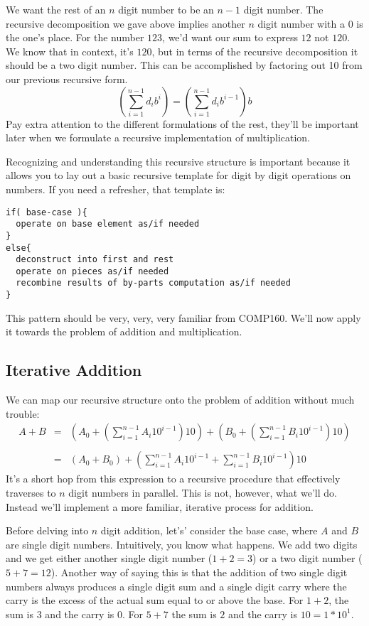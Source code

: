 \documentclass[10pt]{article}
\begin{document}
We want the rest of an $n$ digit number to be an $n-1$ digit number. The recursive decomposition we gave above implies another $n$ digit number with a $0$ is the one's place. For the number $123$, we'd want our sum to express $12$ not $120$. We know that in context, it's $120$, but in terms of the recursive decomposition it should be a two digit number. This can be accomplished by factoring out 10 from our previous recursive form.
\[
\left(\sum\limits_{i=1}^{n-1}d_{i}b^{i}\right) = \left(\sum\limits_{i=1}^{n-1}d_{i}b^{i-1}\right)b
\]
Pay extra attention to the different formulations of the rest, they'll be important later when we formulate a recursive implementation of multiplication.

Recognizing and understanding this recursive structure is important because it allows you to lay out a basic recursive template for digit by digit operations on numbers. If you need a refresher, that template is:
\begin{verbatim}
if( base-case ){
  operate on base element as/if needed
}
else{
  deconstruct into first and rest
  operate on pieces as/if needed
  recombine results of by-parts computation as/if needed
}
\end{verbatim}
This pattern should be very, very, very familiar from COMP160. We'll now apply it towards the problem of addition and multiplication.

\subsection*{Iterative Addition}

We can map our recursive structure onto the problem of addition without much trouble:
\[
\begin{array}{rcl}
A+B &=& \left(A_0 + \left( \sum\limits_{i=1}^{n-1} A_i10^{i-1} \right)10  \right) +
\left(B_0 + \left( \sum\limits_{i=1}^{n-1} B_i10^{i-1} \right)10  \right) \\ \\

&=& (A_0 +  B_0) + \left( \sum\limits_{i=1}^{n-1} A_i10^{i-1} +
\sum\limits_{i=1}^{n-1} B_i10^{i-1} \right)10
\end{array}
\]
It's a short hop from this expression to a recursive procedure that effectively traverses to $n$ digit numbers in parallel. This is not, however, what we'll do.  Instead we'll implement a more familiar, iterative process for addition.

Before delving into $n$ digit addition, let's' consider the base case, where $A$ and $B$ are single digit numbers. Intuitively, you know what happens. We add two digits and we get either another single digit number ($1+2=3$) or a two digit number ($5+7=12$). Another way of saying this is that the addition of two single digit numbers always produces a single digit sum and a single digit carry where the carry is the excess of the actual sum equal to or above the base. For $1+2$, the sum is $3$ and the carry is $0$. For $5+7$ the sum is $2$ and the carry is $10 = 1 * 10^1$.
\end{document}
